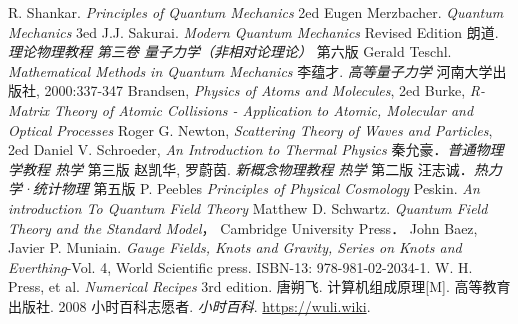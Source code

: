 \begin{thebibliography}{99}
R. Shankar. \textsl{Principles of Quantum Mechanics} 2ed
Eugen Merzbacher. \textsl{Quantum  Mechanics} 3ed
J.J. Sakurai. \textsl{Modern Quantum Mechanics} Revised Edition
朗道. \textsl{理论物理教程 第三卷 量子力学（非相对论理论）} 第六版
Gerald Teschl. \textsl{Mathematical Methods in Quantum Mechanics}
李蕴才. \textsl{高等量子力学} 河南大学出版社, 2000:337-347
Brandsen, \textsl{Physics of Atoms and Molecules}, 2ed
Burke, \textsl{R-Matrix Theory of Atomic Collisions - Application to Atomic, Molecular and Optical Processes}
Roger G. Newton, \textsl{Scattering Theory of Waves and Particles}, 2ed
Daniel V. Schroeder, \textsl{An Introduction to Thermal Physics}
秦允豪．\textsl{普通物理学教程 热学} 第三版
赵凯华, 罗蔚茵. \textsl{新概念物理教程 热学} 第二版
汪志诚．\textsl{热力学·统计物理}  第五版
P. Peebles \textsl{Principles of Physical Cosmology}
Peskin. \textsl{An introduction To Quantum Field Theory}
Matthew D. Schwartz. \textsl{Quantum Field Theory and the Standard Model}， Cambridge University Press．
John Baez, Javier P. Muniain. \textsl{Gauge Fields, Knots and Gravity, Series on Knots and Everthing}-Vol. 4, World Scientific press. ISBN-13: 978-981-02-2034-1. 
W. H. Press, et al. \textsl{Numerical Recipes} 3rd edition. 
唐朔飞. 计算机组成原理[M]. 高等教育出版社. 2008
小时百科志愿者. \textsl{小时百科}. \href{https://wuli.wiki}{https://wuli.wiki}. 
\end{thebibliography}
